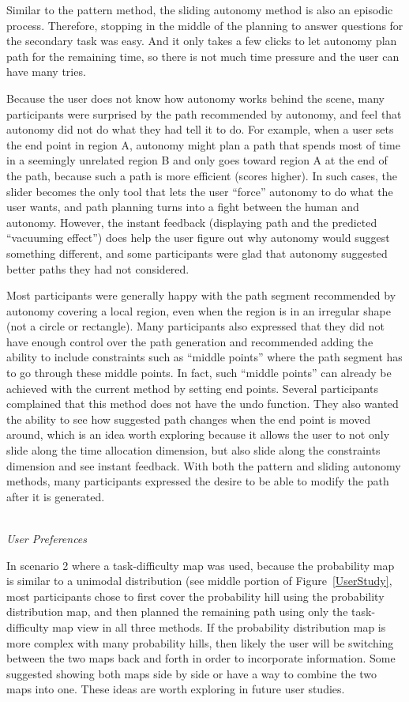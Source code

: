 \documentclass[lettersize, apacite, twoside, HRI]{apa_HRI}
\begin{document}
Similar to the pattern method, the sliding autonomy method is also an episodic process. Therefore, stopping in the middle of the planning to answer questions for the secondary task was easy. And it only takes a few clicks to let autonomy plan path for the remaining time, so there is not much time pressure and the user can have many tries. 

Because the user does not know how autonomy works behind the scene, many participants were surprised by the path recommended by autonomy, and feel that autonomy did not do what they had tell it to do. For example, when a user sets the end point in region A, autonomy might plan a path that spends most of time in a seemingly unrelated region B and only goes toward region A at the end of the path, because such a path is more efficient (scores higher). In such cases, the slider becomes the only tool that lets the user ``force'' autonomy to do what the user wants, and path planning turns into a fight between the human and autonomy. However, the instant feedback (displaying path and the predicted ``vacuuming effect'') does help the user figure out why autonomy would suggest something different, and some participants were glad that autonomy suggested better paths they had not considered. 

Most participants were generally happy with the path segment recommended by autonomy covering a local region, even when the region is in an irregular shape (not a circle or rectangle). Many participants also expressed that they did not have enough control over the path generation and recommended adding the ability to include constraints such as ``middle points'' where the path segment has to go through these middle points. In fact, such ``middle points'' can already be achieved with the current method by setting end points. Several participants complained that this method does not have the undo function. They also wanted the ability to see how suggested path changes when the end point is moved around, which is an idea worth exploring because it allows the user to not only slide along the time allocation dimension, but also slide along the constraints dimension and see instant feedback. With both the pattern and sliding autonomy methods, many participants expressed the desire to be able to modify the path after it is generated.

~\\ \noindent \textit{User Preferences}

In scenario 2 where a task-difficulty map was used, because the probability map is similar to a unimodal distribution (see middle portion of Figure~\ref{UserStudy}, most participants chose to first cover the probability hill using the probability distribution map, and then planned the remaining path using only the task-difficulty map view in all three methods. If the probability distribution map is more complex with many probability hills, then likely the user will be switching between the two maps back and forth in order to incorporate information. Some suggested showing both maps side by side or have a way to combine the two maps into one. These ideas are worth exploring in future user studies.
\end{document}
